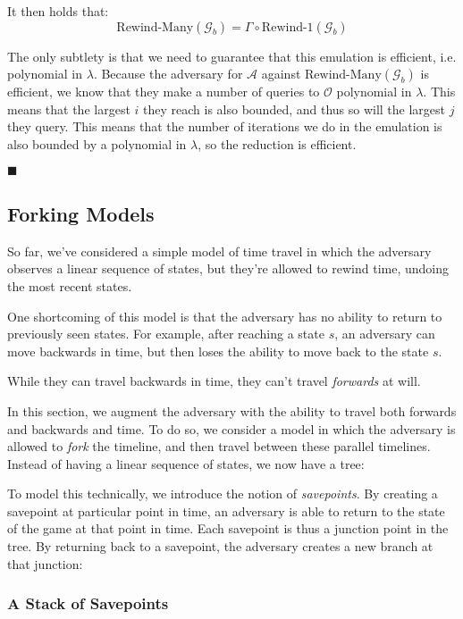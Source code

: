 It then holds that:
$$
\text{Rewind-Many}(\mathcal{G}_b) = \Gamma \circ \text{Rewind-1}(\mathcal{G}_b)
$$

The only subtlety is that we need to guarantee that this emulation
is efficient, i.e. polynomial in $\lambda$.
Because the adversary for $\mathcal{A}$ against $\text{Rewind-Many}(\mathcal{G}_b)$
is efficient, we know that they make a number of queries to $\mathcal{O}$ polynomial
in $\lambda$.
This means that the largest $i$ they reach is also bounded, and thus so will the largest
$j$ they query.
This means that the number of iterations we do in the emulation is also bounded by a polynomial
in $\lambda$, so the reduction is efficient.

$\blacksquare$

\subsection{Forking Models}

So far, we've considered a simple model of time travel in which the
adversary observes a linear sequence of states, but they're allowed to
rewind time, undoing the most recent states.


One shortcoming of this model is that the adversary has no ability to
return to previously seen states.
For example, after reaching a state $s$, an adversary can move backwards
in time, but then loses the ability to move back to the state $s$.

While they can travel backwards in time, they can't travel \emph{forwards}
at will.

In this section, we augment the adversary with the ability to travel both
forwards and backwards and time.
To do so, we consider a model in which the adversary is allowed
to \emph{fork} the timeline, and then travel between these parallel timelines.
Instead of having a linear sequence of states, we now have a tree:


To model this technically, we introduce the notion of \emph{savepoints}.
By creating a savepoint at particular point in time, an adversary is
able to return to the state of the game at that point in time.
Each savepoint is thus a junction point in the tree.
By returning back to a savepoint, the adversary creates a new branch
at that junction:


\subsubsection{A Stack of Savepoints}

